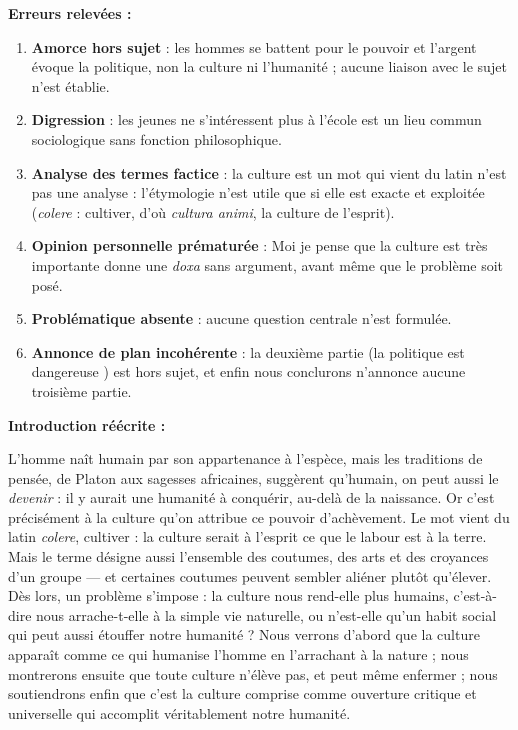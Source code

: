 \documentclass[11pt]{article}
\begin{document}
\begin{corrige}
\textbf{Erreurs relevées :}
\begin{enumerate}
\item \textbf{Amorce hors sujet} : \guillemotleft les hommes se battent pour le pouvoir et l'argent \guillemotright évoque la politique, non la culture ni l'humanité ; aucune liaison avec le sujet n'est établie.
\item \textbf{Digression} : \guillemotleft les jeunes ne s'intéressent plus à l'école \guillemotright est un lieu commun sociologique sans fonction philosophique.
\item \textbf{Analyse des termes factice} : \guillemotleft la culture est un mot qui vient du latin \guillemotright n'est pas une analyse : l'étymologie n'est utile que si elle est exacte et exploitée (\emph{colere} : cultiver, d'où \emph{cultura animi}, la culture de l'esprit).
\item \textbf{Opinion personnelle prématurée} : \guillemotleft Moi je pense que la culture est très importante \guillemotright donne une \emph{doxa} sans argument, avant même que le problème soit posé.
\item \textbf{Problématique absente} : aucune question centrale n'est formulée.
\item \textbf{Annonce de plan incohérente} : la deuxième partie (\guillemotleft la politique est dangereuse \guillemotright) est hors sujet, et \guillemotleft enfin nous conclurons \guillemotright n'annonce aucune troisième partie.
\end{enumerate}

\textbf{Introduction réécrite :}

L'homme naît humain par son appartenance à l'espèce, mais les traditions de pensée, de Platon aux sagesses africaines, suggèrent qu'humain, on peut aussi le \emph{devenir} : il y aurait une humanité à conquérir, au-delà de la naissance. Or c'est précisément à la culture qu'on attribue ce pouvoir d'achèvement. Le mot vient du latin \emph{colere}, cultiver : la culture serait à l'esprit ce que le labour est à la terre. Mais le terme désigne aussi l'ensemble des coutumes, des arts et des croyances d'un groupe --- et certaines coutumes peuvent sembler aliéner plutôt qu'élever. Dès lors, un problème s'impose : la culture nous rend-elle plus humains, c'est-à-dire nous arrache-t-elle à la simple vie naturelle, ou n'est-elle qu'un habit social qui peut aussi étouffer notre humanité ? Nous verrons d'abord que la culture apparaît comme ce qui humanise l'homme en l'arrachant à la nature ; nous montrerons ensuite que toute culture n'élève pas, et peut même enfermer ; nous soutiendrons enfin que c'est la culture comprise comme ouverture critique et universelle qui accomplit véritablement notre humanité.
\end{corrige}
\end{document}
